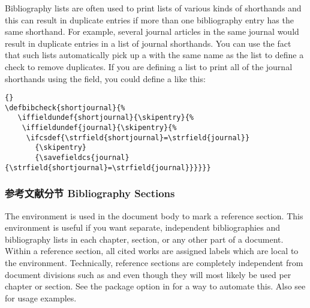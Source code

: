 Bibliography lists are often used to print lists of various kinds of shorthands and this can result in duplicate entries if more than one bibliography entry has the same shorthand. For example, several journal articles in the same journal would result in duplicate entries in a list of journal shorthands. You can use the fact that such lists automatically pick up a  with the same name as the list to define a check to remove duplicates. If you are defining a list to print all of the journal shorthands using the  field, you could define a  like this:

\begin{lstlisting}[style=latex]{}
\defbibcheck{shortjournal}{%
   \iffieldundef{shortjournal}{\skipentry}{%
    \iffieldundef{journal}{\skipentry}{%
     \ifcsdef{\strfield{shortjournal}=\strfield{journal}}
       {\skipentry}
       {\savefieldcs{journal}{\strfield{shortjournal}=\strfield{journal}}}}}}
\end{lstlisting}

\subsubsection{参考文献分节 Bibliography Sections}
\label{use:bib:sec}

The  environment is used in the document body to mark a reference section. This environment is useful if you want separate, independent bibliographies and bibliography lists in each chapter, section, or any other part of a document. Within a reference section, all cited works are assigned labels which are local to the environment. Technically, reference sections are completely independent from document divisions such as  and  even though they will most likely be used per chapter or section. See the  package option in  for a way to automate this. Also see  for usage examples.

